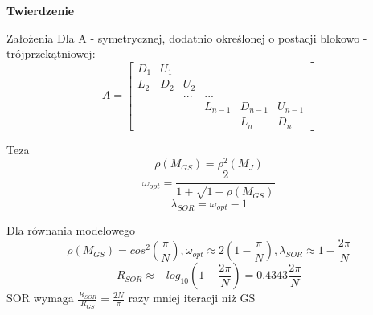   

\begin{frame}{}
  \textbf{Twierdzenie}
  \begin{block}{Założenia}
    Dla A - symetrycznej, dodatnio określonej o postacji blokowo - trójprzekątniowej:
    $$
    A=\begin{bmatrix}
    D_1 & U_1 &&&&\\
    L_2 & D_2 & U_2 &&& \\
    &&...&...&&\\
    &&&L_{n-1}&D_{n-1}&U_{n-1}\\
    &&&&L_n&D_n
    \end{bmatrix}
    $$
  \end{block}
\end{frame}

\begin{frame}
  \begin{block}{Teza}
    $$\rho(M_{GS})=\rho^2(M_J)$$
    $$\omega_{opt}=\frac{2}{1+\sqrt{1-\rho(M_{GS})}}$$
    $$\lambda_{SOR}=\omega_{opt}-1$$
  \end{block}
  \begin{exampleblock}{Dla równania modelowego}
     $$\rho(M_{GS})=cos^2(\frac{\pi}{N}), \omega_{opt}\approx2(1-\frac{\pi}{N}), \lambda_{SOR}\approx 1-\frac{2\pi}{N}$$
    $$
    R_{SOR}\approx -log_{10}(1-\frac{2\pi}{N})=0.4343 \frac{2\pi}{N}
    $$
    SOR wymaga
    $
    \frac{R_{SOR}}{R_{GS}}=\frac{2N}{\pi}
    $ razy mniej iteracji niż GS
  \end{exampleblock}
\end{frame}


